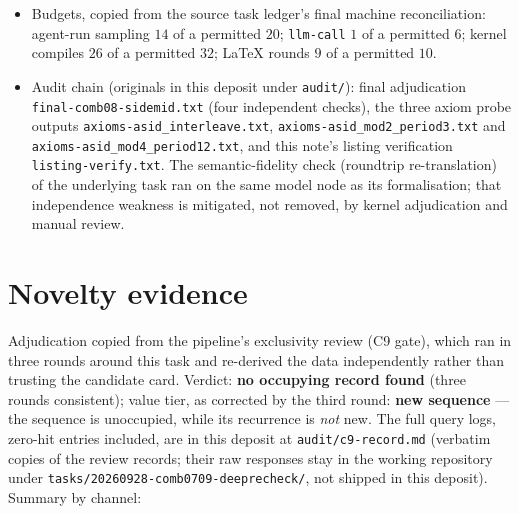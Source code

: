 \documentclass[11pt]{article}
\theoremstyle{definition}
\begin{document}
\begin{itemize}
\item Budgets, copied from the source task ledger's final machine
reconciliation: agent-run sampling $14$ of a permitted $20$;
\texttt{llm-call} $1$ of a permitted $6$; kernel compiles $26$ of a permitted
$32$; LaTeX rounds $9$ of a permitted $10$.
\item Audit chain (originals in this deposit under \texttt{audit/}): final
adjudication \texttt{final-comb08-sidemid.txt} (four independent checks), the
three axiom probe outputs
\texttt{axioms-asid\_}\allowbreak\texttt{interleave.txt},
\texttt{axioms-asid\_}\allowbreak\texttt{mod2\_period3.txt} and
\texttt{axioms-asid\_}\allowbreak\texttt{mod4\_period12.txt}, and this note's
listing verification \texttt{listing-verify.txt}. The semantic-fidelity check
(roundtrip re-translation) of the underlying task ran on the same model node
as its formalisation; that independence weakness is mitigated, not removed,
by kernel adjudication and manual review.
\end{itemize}

\section{Novelty evidence}\label{sec:novelty}

Adjudication copied from the pipeline's exclusivity review (C9 gate), which
ran in three rounds around this task and re-derived the data independently
rather than trusting the candidate card. Verdict: \textbf{no occupying record
found} (three rounds consistent); value tier, as corrected by the third
round: \textbf{new sequence} --- the sequence is unoccupied, while its
recurrence is \emph{not} new. The full query logs, zero-hit entries included,
are in this deposit at \texttt{audit/c9-record.md} (verbatim copies of the
review records; their raw responses stay in the working repository under
\texttt{tasks/20260928-comb0709-deeprecheck/}, not shipped in this deposit).
Summary by channel:
\end{document}
